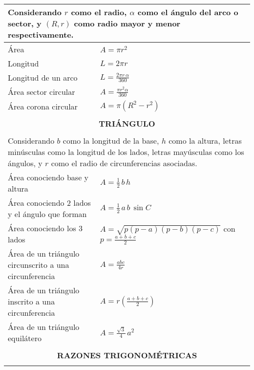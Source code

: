 \begin{center}
{\begin{tabular}{|p{}|p{}|}
\multicolumn{2}{|p{0.96\columnwidth}|}{Considerando $r$ como el radio, $\alpha$ como el ángulo del arco o sector, y $(R,r)$ como radio mayor y menor respectivamente.} \\ \hline

Área                   & $\displaystyle A = \pi r^{2}$ \\ \hline
Longitud               & $\displaystyle L = 2\pi r$  \\ \hline
Longitud de un arco    & $\displaystyle L = \frac{2\pi r\,\alpha}{360}$  \\ \hline
Área sector circular   & $\displaystyle A = \frac{\pi r^{2} \alpha}{360}$ \\ \hline
Área corona circular   & $\displaystyle A = \pi (R^{2} - r^{2})$ \\ \hline

\multicolumn{2}{|c|}{} \\
\multicolumn{2}{|c|}{\textbf{TRIÁNGULO}} \\
\multicolumn{2}{|c|}{} \\ \hline

\multicolumn{2}{|p{0.96\columnwidth}|}{Considerando $b$ como la longitud de la base, $h$ como la altura, letras minúsculas como la longitud de los lados, letras mayúsculas como los ángulos, y $r$ como el radio de circunferencias asociadas.} \\ \hline

Área conociendo base y altura & $\displaystyle A = \frac{1}{2}\, b\, h$ \\ \hline
Área conociendo 2 lados y el ángulo que forman & $\displaystyle A = \frac{1}{2}\, a\, b\, \sin C$ \\ \hline
Área conociendo los 3 lados & $\displaystyle A = \sqrt{p(p - a)(p - b)(p - c)}$ con $\displaystyle p = \frac{a + b + c}{2}$ \\ \hline
Área de un triángulo circunscrito a una circunferencia & $\displaystyle A = \frac{abc}{4r}$ \\ \hline
Área de un triángulo inscrito a una circunferencia & $\displaystyle A = r\!\left(\frac{a+b+c}{2}\right)$ \\ \hline
Área de un triángulo equilátero & $\displaystyle A = \frac{\sqrt{3}}{4}\, a^{2}$ \\ \hline

\multicolumn{2}{|c|}{} \\
\multicolumn{2}{|c|}{\textbf{RAZONES TRIGONOMÉTRICAS}} \\
\multicolumn{2}{|c|}{} \\ \hline


\end{tabular}}
\end{center}

